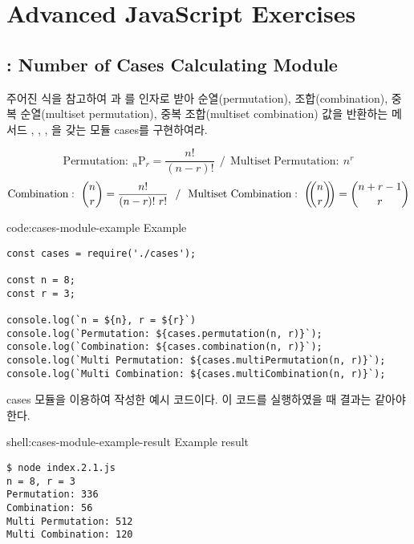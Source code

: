 \section{Advanced JavaScript Exercises}\label{sect:advanced-js-exercises}

\subsection*{: Number of Cases Calculating Module}

주어진 식을 참고하여 과 를 인자로 받아 순열(permutation), 조합(combination), 중복 순열(multiset permutation), 중복 조합(multiset combination) 값을 반환하는 메서드 , , , 을 갖는 모듈 cases를 구현하여라.

$$ \mathrm{Permutation}:~{}_n\mathrm{P}_r = \frac{n!}{(n-r)!}~~/~~\mathrm{Multiset~Permutation}:~n^r $$
$$ \mathrm{Combination}:~\binom{n}{r} = \frac{n!}{(n-r)!~r!}~~/~~\mathrm{Multiset~Combination}:~\left(\kern-.3em\binom{n}{r}\kern-.3em\right) = \binom{n+r-1}{r} $$

\begin{code}{code:cases-module-example}{ Example}
\begin{verbatim}
const cases = require('./cases');

const n = 8;
const r = 3;

console.log(`n = ${n}, r = ${r}`)
console.log(`Permutation: ${cases.permutation(n, r)}`);
console.log(`Combination: ${cases.combination(n, r)}`);
console.log(`Multi Permutation: ${cases.multiPermutation(n, r)}`);
console.log(`Multi Combination: ${cases.multiCombination(n, r)}`);
\end{verbatim}
\end{code}

\은 cases 모듈을 이용하여 작성한 예시 코드이다. 이 코드를 실행하였을 때 결과는 \와 같아야 한다.

\begin{shell}{shell:cases-module-example-result}{ Example result}
\begin{verbatim}
$ node index.2.1.js
n = 8, r = 3
Permutation: 336
Combination: 56
Multi Permutation: 512
Multi Combination: 120
\end{verbatim}
\end{shell}

